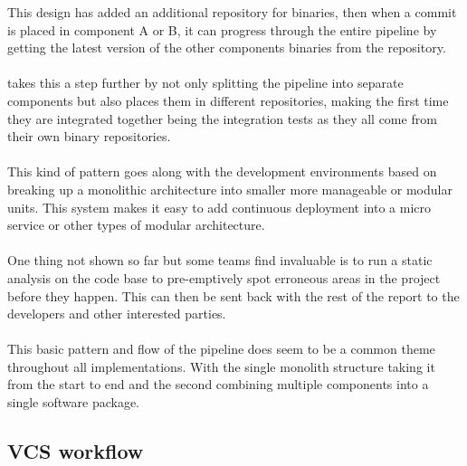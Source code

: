 This design has added an additional repository for binaries, then when a commit is placed in component A or B, it can progress through the entire pipeline by getting the latest version of the other components binaries from the repository. 
\\\\
\cite{thoughworks} takes this a step further by not only splitting the pipeline into separate components  but also places them in different repositories, making the first time they are integrated together being the integration tests as they all come from their own binary repositories.
\\\\
This kind of pattern goes along with the development environments based on breaking up a monolithic architecture  into smaller more manageable or modular units. This system makes it easy to add continuous deployment into a micro service or other types of modular architecture.
\\\\
One thing not shown so far but some teams find invaluable is to run a static analysis on the code base to pre-emptively spot erroneous areas in the project before they happen. This can then be sent back with the rest of the report to the developers and other interested parties.
\\\\
This basic pattern and flow of the pipeline does seem to be a common theme throughout all implementations.  With the single monolith structure taking it from the start to end and the second combining multiple components into a single software package. 

\subsection{VCS workflow}
\label{sec:vcs}

